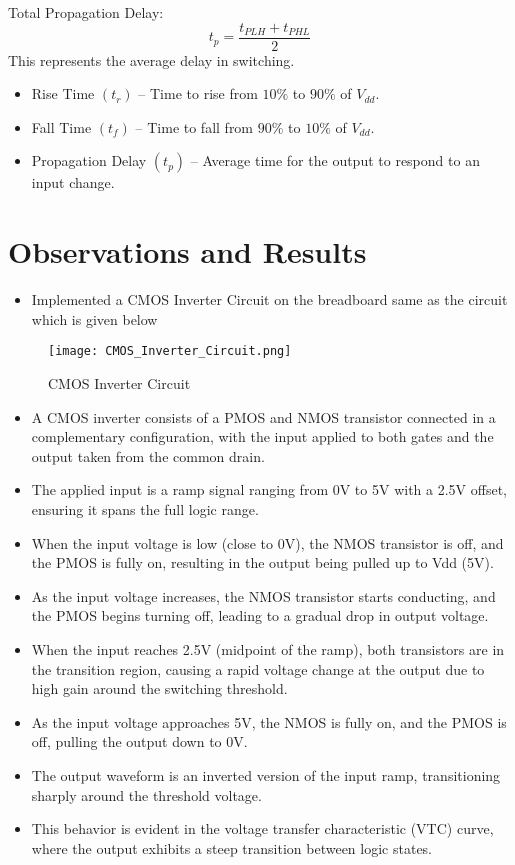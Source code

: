 \documentclass[9pt,conference]{IEEEtran}
\begin{document}
Total Propagation Delay:
\begin{equation}
    t_p = \frac{t_{PLH} + t_{PHL}}{2}
\end{equation}
This represents the average delay in switching.

\begin{itemize}
    \item  Rise Time \( (t_r) \) – Time to rise from \(10\%\) to \(90\%\) of \( V_{dd} \).
    \item Fall Time \( (t_f) \) – Time to fall from \(90\%\) to \(10\%\) of \( V_{dd} \).
    \item Propagation Delay \( (t_p) \) – Average time for the output to respond to an input change.
\end{itemize}


\section{Observations and Results}
\begin{itemize}
    \item Implemented a CMOS Inverter Circuit on the breadboard same as the circuit which is given below
\end{itemize}
\begin{figure}[H]
    \centering
    \texttt{[image: CMOS\_Inverter\_Circuit.png]}
    \caption{CMOS Inverter Circuit}
    \label{fig:clamper_circuit}
\end{figure}

\begin{itemize}
    \item A CMOS inverter consists of a PMOS and NMOS transistor connected in a complementary configuration, with the input applied to both gates and the output taken from the common drain.
    \item The applied input is a ramp signal ranging from 0V to 5V with a 2.5V offset, ensuring it spans the full logic range.
    \item When the input voltage is low (close to 0V), the NMOS transistor is off, and the PMOS is fully on, resulting in the output being pulled up to Vdd (5V).
    \item As the input voltage increases, the NMOS transistor starts conducting, and the PMOS begins turning off, leading to a gradual drop in output voltage.
    \item When the input reaches 2.5V (midpoint of the ramp), both transistors are in the transition region, causing a rapid voltage change at the output due to high gain around the switching threshold.
    \item As the input voltage approaches 5V, the NMOS is fully on, and the PMOS is off, pulling the output down to 0V.
    \item The output waveform is an inverted version of the input ramp, transitioning sharply around the threshold voltage.
    \item This behavior is evident in the voltage transfer characteristic (VTC) curve, where the output exhibits a steep transition between logic states.
\end{itemize}
\end{document}
